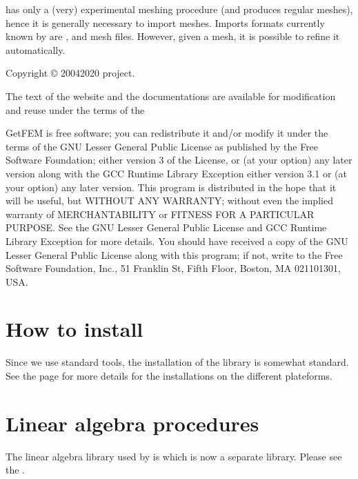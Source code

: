 \documentclass[a4paper,11pt,english]{sphinxmanual}
\begin{document}
 has only a (very) experimental meshing procedure (and produces regular meshes), hence it is generally
necessary to import meshes. Imports formats currently known by 
are ,  and  mesh files. However, given a mesh, it
is possible to refine it automatically.

Copyright © 2004\sphinxhyphen{}2020  project.

The text of the  website and the documentations are available for modification and reuse under the terms of the 

GetFEM  is  free software;  you  can  redistribute  it  and/or modify it
under  the  terms  of the  GNU  Lesser General Public License as published
by  the  Free Software Foundation;  either version 3 of the License,  or
(at your option) any later version along with the GCC Runtime Library
Exception either version 3.1 or (at your option) any later version.
This program  is  distributed  in  the  hope  that it will be useful,  but
WITHOUT ANY WARRANTY; without even the implied warranty of MERCHANTABILITY
or  FITNESS  FOR  A PARTICULAR PURPOSE.  See the GNU Lesser General Public
License and GCC Runtime Library Exception for more details.
You  should  have received a copy of the GNU Lesser General Public License
along  with  this program;  if not, write to the Free Software Foundation,
Inc., 51 Franklin St, Fifth Floor, Boston, MA  02110\sphinxhyphen{}1301, USA.


\chapter{How to install}
\label{\detokenize{userdoc/install:how-to-install}}\label{\detokenize{userdoc/install:ud-install}}\label{\detokenize{userdoc/install::doc}}
Since we use standard  tools, the installation of the  library is
somewhat standard. See the  page for more details for the installations on the different plateforms.


\chapter{Linear algebra procedures}
\label{\detokenize{userdoc/linalg:linear-algebra-procedures}}\label{\detokenize{userdoc/linalg:ud-linalg}}\label{\detokenize{userdoc/linalg::doc}}
The linear algebra library used by  is  which is now a separate library.
Please see the .
\end{document}
